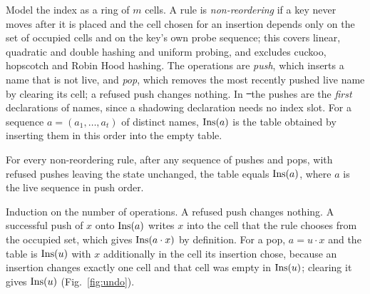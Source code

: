 Model the index as a ring of $m$ cells. A rule is \emph{non-reordering} if a key never moves after it is placed and the cell chosen for an insertion depends only on the set of occupied cells and on the key's own probe sequence; this covers linear, quadratic and double hashing and uniform probing, and excludes cuckoo, hopscotch and Robin Hood hashing. The operations are \emph{push}, which inserts a name that is not live, and \emph{pop}, which removes the most recently pushed live name by clearing its cell; a refused push changes nothing. In \st\ the pushes are the \emph{first} declarations of names, since a shadowing declaration needs no index slot. For a sequence $a=(a_1,\ldots,a_t)$ of distinct names, $\mathrm{Ins}(a)$ is the table obtained by inserting them in this order into the empty table.

\begin{theorem}
\label{thm:undo}
For every non-reordering rule, after any sequence of pushes and pops, with refused pushes leaving the state unchanged, the table equals $\mathrm{Ins}(a)$, where $a$ is the live sequence in push order.
\end{theorem}

\begin{IEEEproof}
Induction on the number of operations. A refused push changes nothing. A successful push of $x$ onto $\mathrm{Ins}(a)$ writes $x$ into the cell that the rule chooses from the occupied set, which gives $\mathrm{Ins}(a\cdot x)$ by definition. For a pop, $a=u\cdot x$ and the table is $\mathrm{Ins}(u)$ with $x$ additionally in the cell its insertion chose, because an insertion changes exactly one cell and that cell was empty in $\mathrm{Ins}(u)$; clearing it gives $\mathrm{Ins}(u)$ (Fig.~\ref{fig:undo}).
\end{IEEEproof}

